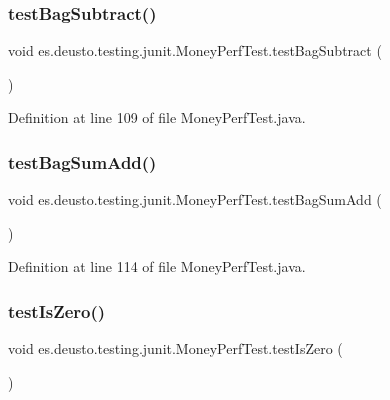 \subsubsection{\texorpdfstring{testBagSubtract()}{testBagSubtract()}}
{\footnotesize\ttfamily void es.\+deusto.\+testing.\+junit.\+Money\+Perf\+Test.\+test\+Bag\+Subtract (\begin{DoxyParamCaption}{ }\end{DoxyParamCaption})}



Definition at line 109 of file Money\+Perf\+Test.\+java.

\mbox{\label{classes_1_1deusto_1_1testing_1_1junit_1_1_money_perf_test_aac894056ed4f7770c451c33e4df3b8b5}} 
\subsubsection{\texorpdfstring{testBagSumAdd()}{testBagSumAdd()}}
{\footnotesize\ttfamily void es.\+deusto.\+testing.\+junit.\+Money\+Perf\+Test.\+test\+Bag\+Sum\+Add (\begin{DoxyParamCaption}{ }\end{DoxyParamCaption})}



Definition at line 114 of file Money\+Perf\+Test.\+java.

\mbox{\label{classes_1_1deusto_1_1testing_1_1junit_1_1_money_perf_test_a6c1d6dd0a4a73db679e23546f618663a}} 
\subsubsection{\texorpdfstring{testIsZero()}{testIsZero()}}
{\footnotesize\ttfamily void es.\+deusto.\+testing.\+junit.\+Money\+Perf\+Test.\+test\+Is\+Zero (\begin{DoxyParamCaption}{ }\end{DoxyParamCaption})}



